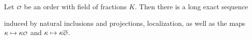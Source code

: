     \begin{proposition}\label{prop:long_exact_sequence_orders}
      Let \(\smc{O}\) be an order with field of fractions \(K\). Then there is a long exact sequence
      \begin{center}
      \end{center}
      induced by natural inclusions and projections, localization, as well as the maps \(\k \mapsto \k\smc{O}\) and \(\k \mapsto \k\conj{\smc{O}}\).
    \end{proposition}

